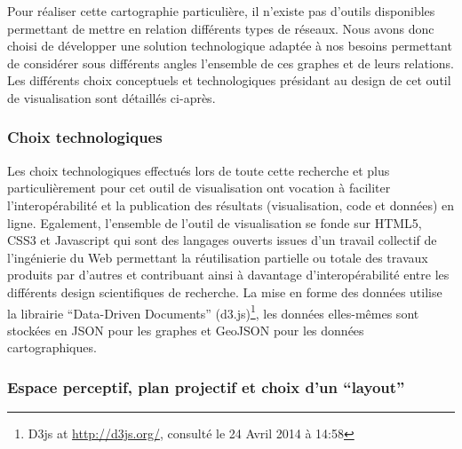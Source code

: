 Pour r\'ealiser cette cartographie particuli\`ere, il
n{\textquoteright}existe pas d{\textquoteright}outils disponibles
permettant de mettre en relation diff\'erents types de r\'eseaux. Nous
avons donc choisi de d\'evelopper une solution technologique adapt\'ee
\`a nos besoins permettant de consid\'erer sous diff\'erents angles
l{\textquoteright}ensemble de ces graphes et de leurs relations. Les
diff\'erents choix conceptuels et technologiques pr\'esidant au design
de cet outil de visualisation sont d\'etaill\'es ci-apr\`es.

\subsubsection{Choix technologiques}

Les choix technologiques effectu\'es lors de toute cette recherche et
plus particuli\`erement pour cet outil de visualisation ont vocation
\`a faciliter l{\textquoteright}interop\'erabilit\'e et la publication
des r\'esultats (visualisation, code et donn\'ees) en ligne. Egalement,
l{\textquoteright}ensemble de l{\textquoteright}outil de visualisation
se fonde sur HTML5, CSS3 et Javascript qui sont des langages ouverts
issues d{\textquoteright}un travail collectif de
l{\textquoteright}ing\'enierie du Web permettant la r\'eutilisation
partielle ou totale des travaux produits par d{\textquoteright}autres
et contribuant ainsi \`a davantage
d{\textquoteright}interop\'erabilit\'e entre les diff\'erents design
scientifiques de recherche. La mise en forme des donn\'ees utilise la
librairie {\textquotedblleft}Data-Driven Documents{\textquotedblright}
(d3.js)\footnote{ D3js at \url{http://d3js.org/,} consult\'e le 24
Avril 2014 \`a 14:58}, les donn\'ees elles-m\^emes sont stock\'ees en
JSON pour les graphes et GeoJSON pour les donn\'ees cartographiques.

\subsubsection{Espace perceptif, plan projectif et choix
d{\textquoteright}un {\textquotedblleft}layout{\textquotedblright}}


